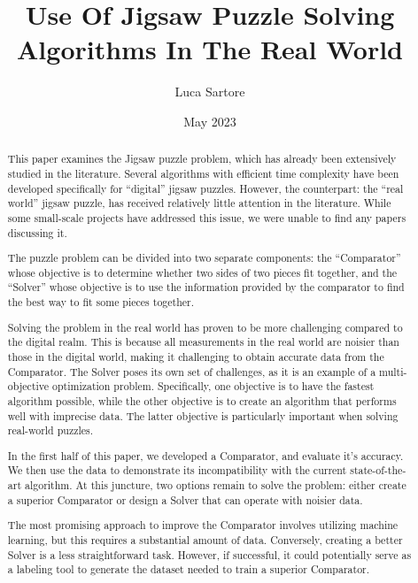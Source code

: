 \documentclass{article}
\title{Use Of Jigsaw Puzzle Solving Algorithms In The Real World}
\author{Luca Sartore}
\date{May 2023}
\begin{document}
\maketitle

\newpage

{
  \hypersetup{linkcolor=black}
  \tableofcontents
}

\newpage

\begin{abstract}
This paper examines the Jigsaw puzzle problem,
which has already been extensively studied in the literature.
Several algorithms with efficient time complexity have been developed
specifically for ``digital'' jigsaw puzzles. However, the counterpart:
the ``real world'' jigsaw puzzle, has received relatively little attention
in the literature. While some small-scale projects have addressed this issue,
we were unable to find any papers discussing it.

The puzzle problem can be divided into two separate components: the ``Comparator''
whose objective is to determine whether two sides of two pieces fit together,
and the ``Solver'' whose objective is to use the information provided
by the comparator to find the best way to fit some pieces together.

Solving the problem in the real world has proven to be more challenging compared
to the digital realm.
This is because all measurements in the real world are noisier than those
in the digital world, making it challenging to obtain accurate data from the Comparator.
The Solver poses its own set of challenges, as it is an example of a
multi-objective optimization problem. Specifically, one objective is to have
the fastest algorithm possible,
while the other objective is to create an algorithm that performs well with
imprecise data. The latter objective is particularly important when solving
real-world puzzles.

In the first half of this paper, we developed a Comparator, and evaluate it's accuracy.
We then use the data to demonstrate its incompatibility with the current
state-of-the-art algorithm. At this juncture,
two options remain to solve the problem:
either create a superior Comparator or design a
Solver that can operate with noisier data.

The most promising approach to improve the Comparator
involves utilizing machine learning, but this requires a substantial amount of data.
Conversely, creating a better Solver is a less straightforward task.
However, if successful, it could potentially serve as a labeling tool
to generate the dataset needed to train a superior Comparator.


\end{abstract}
\end{document}
